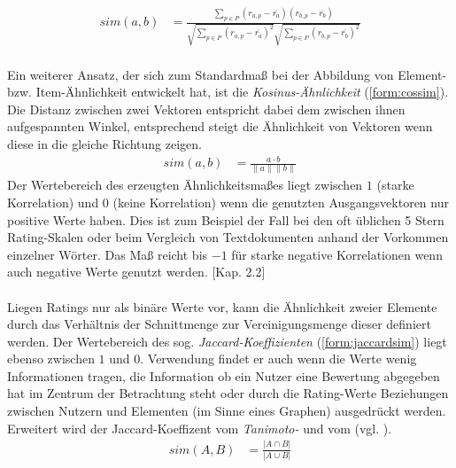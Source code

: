 \begin{align}
\label{form:pearsonsim}
sim(a,b) & = \frac{\sum_{p \in P} (r_{a,p}-\bar{r_a})(r_{b,p}-\bar{r_b})}{\sqrt{\sum_{p \in P} (r_{a,p}-\bar{r_a})^2 }\sqrt{\sum_{p \in P} (r_{b,p}-\bar{r_b})^2 }}
\end{align}

\paragraph{} Ein weiterer Ansatz, der sich zum Standardmaß bei der Abbildung von Element- bzw. Item-Ähnlichkeit entwickelt hat, ist die \textit{Kosinus-Ähnlichkeit} (\ref{form:cossim}). Die Distanz zwischen zwei Vektoren entspricht dabei dem zwischen ihnen aufgespannten Winkel, entsprechend steigt die Ähnlichkeit von Vektoren wenn diese in die gleiche Richtung zeigen. 
\begin{align}
\label{form:cossim}
sim(a,b) & = \frac{a \cdot b}{\|a\| \|b\|}
\end{align}
Der Wertebereich des erzeugten Ähnlichkeitsmaßes liegt zwischen $1$ (starke Korrelation) und $0$ (keine Korrelation) wenn die genutzten Ausgangsvektoren nur positive Werte haben. Dies ist zum Beispiel der Fall bei den oft üblichen 5 Stern Rating-Skalen oder beim Vergleich von Textdokumenten anhand der Vorkommen einzelner Wörter. Das Maß reicht bis $-1$ für starke negative Korrelationen wenn auch negative Werte genutzt werden. \citep{rs}[Kap. 2.2]

\paragraph{} Liegen Ratings nur als binäre Werte vor, kann die Ähnlichkeit zweier Elemente durch das Verhältnis der Schnittmenge zur Vereinigungsmenge dieser definiert werden. Der Wertebereich des sog. \textit{Jaccard-Koeffizienten} (\ref{form:jaccardsim}) liegt ebenso zwischen $1$ und $0$. Verwendung findet er auch wenn die Werte wenig Informationen tragen, die Information ob ein Nutzer eine Bewertung abgegeben hat im Zentrum der Betrachtung steht oder durch die Rating-Werte Beziehungen zwischen Nutzern und Elementen (im Sinne eines Graphen) ausgedrückt werden. Erweitert wird der Jaccard-Koeffizent vom \textit{Tanimoto-} und vom \textit{} (vgl. \citep{bogers09}). \citep[Kap. 3.1]{rs} \citep{pci}
\begin{align}
\label{form:jaccardsim}
sim(A,B) & = \frac{|A \cap B|}{|A \cup B|}
\end{align}

